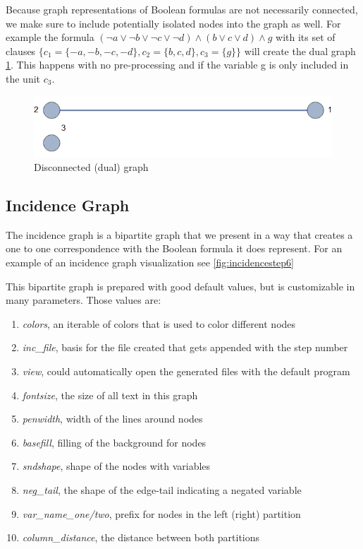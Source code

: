 \documentclass[a4paper, 12pt, bibliography=totoc]{scrartcl}
\begin{document}
Because graph representations of Boolean formulas are not necessarily connected, we make sure to include potentially isolated nodes into the graph as well.
For example the formula $(\neg a\lor \neg b\lor \neg c\lor \neg d)\land (b\lor c\lor d)\land g$
with its set of clauses $\{c_{1}=\{-a,-b,-c,-d\},c_{2}=\{b,c,d\},c_{3}=\{g\}\}$ will create the dual graph \ref{fig:disconnected123}. This happens with no pre-processing and if the variable g is only included in the unit $c_{3}$.

\begin{figure}[H]
	\centering
	\includegraphics{images/disconnected123.png}
	\caption{Disconnected (dual) graph}
	\label{fig:disconnected123}
\end{figure}

\subsection{Incidence Graph}\label{sec:incid}
The incidence graph is a bipartite graph that we present in a way that creates a one to one correspondence with the 
Boolean formula it does represent. For an example of an incidence graph visualization see \ref{fig:incidencestep6}

This bipartite graph is prepared with good default values, but is customizable in many parameters.
Those values are:

\begin{enumerate}
	\item \textit{colors}, an iterable of colors that is used to color different nodes
	\item \textit{inc\_file}, basis for the file created that gets appended with the step number
	\item \textit{view}, could automatically open the generated files with the default program
	\item \textit{fontsize}, the size of all text in this graph
	\item \textit{penwidth}, width of the lines around nodes
	\item \textit{basefill}, filling of the background for nodes
	\item \textit{sndshape}, shape of the nodes with variables
	\item \textit{neg\_tail}, the shape of the edge-tail indicating a negated variable
	\item \textit{var\_name\_one/two}, prefix for nodes in the left (right) partition
	\item \textit{column\_distance}, the distance between both partitions
\end{enumerate}
\end{document}
